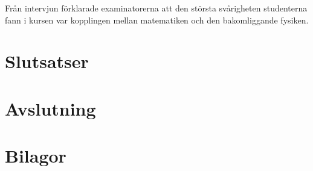 \documentclass[]{article}
\begin{document}



Från intervjun förklarade examinatorerna att den största svårigheten studenterna
fann i kursen var kopplingen mellan matematiken och den bakomliggande fysiken.



\section{Slutsatser}

\section{Avslutning}
%

\newpage




\newpage

\section{Bilagor}
\end{document}
